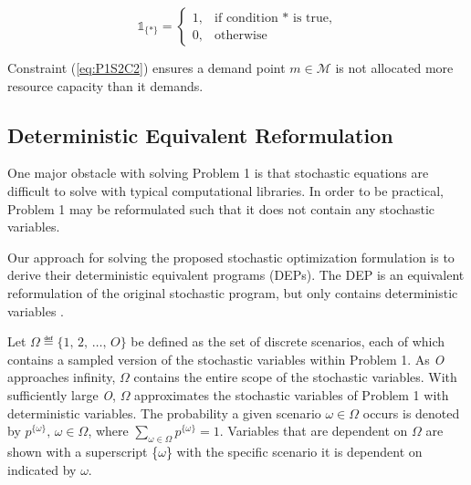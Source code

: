 \documentclass[onecolumn,draftcls]{IEEEtran}
\begin{document}
\[ \mathbb{1}_{\{*\}} =
	\begin{cases}
		1,& \text{if condition $*$ is true,}\\
		0,& \text{otherwise}
	\end{cases}
\]

Constraint (\ref{eq:P1S2C2}) ensures a demand point $m \in \mathcal{M}$ is not allocated more resource capacity than it demands.



\subsection{Deterministic Equivalent Reformulation} \label{dep}


One major obstacle with solving Problem 1 is that stochastic equations are difficult to solve with typical computational libraries.  In order to be practical, Problem 1 may be reformulated such that it does not contain any stochastic variables.

Our approach for solving the proposed stochastic optimization formulation is to derive their deterministic equivalent programs (DEPs).  The DEP is an equivalent reformulation of the original stochastic program, but only contains deterministic variables \cite{stochprogramming}.

Let $ \Omega \eqdef \{1,\, 2,\, \ldots,\, O\} $ be defined as the set of discrete scenarios, each of which contains a sampled version of the stochastic variables within Problem 1.  As \textit{O} approaches infinity, $\Omega$ contains the entire scope of the stochastic variables.  With sufficiently large \textit{O}, $\Omega$ approximates the stochastic variables of Problem 1 with deterministic variables.  The probability a given scenario $\omega \in \Omega$ occurs is denoted by $p^{\{\omega\}},\, \omega \in \Omega$, where $\sum_{\omega \in \Omega} p^{\{\omega\}} = 1$.  Variables that are dependent on $\Omega$ are shown with a superscript \{$\omega$\} with the specific scenario it is dependent on indicated by $\omega$.
\end{document}
